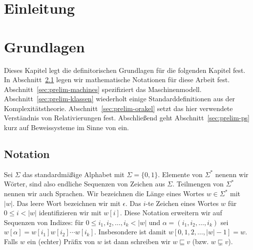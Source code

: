 \chapter{Einleitung}



\chapter{Grundlagen}

Dieses Kapitel legt die definitorischen Grundlagen für die folgenden Kapitel fest. In Abschnitt~\ref{sec:notation} legen wir mathematische Notationen für diese Arbeit fest. Abschnitt~\ref{sec:prelim-machines} spezifiziert das Maschinenmodell.  Abschnitt~\ref{sec:prelim-klassen} wiederholt einige Standarddefinitionen aus der Komplexitätstheorie. Abschnitt~\ref{sec:prelim-orakel} setzt das hier verwendete Verständnis von Relativierungen fest. Abschließend geht Abschnitt~\ref{sec:prelim-ps} kurz auf Beweissysteme im Sinne von \textcite{cook_relative_1979} ein.

\section{Notation}\label{sec:notation}

Sei $\Sigma$ das standardmäßige Alphabet mit $\Sigma=\{0,1\}$. Elemente von $\Sigma^*$ nenenn wir Wörter, sind also endliche Sequenzen von Zeichen aus $\Sigma$. Teilmengen von $\Sigma^*$ nennen wir auch Sprachen. Wir bezeichnen die Länge eines Wortes $w\in\Sigma^*$ mit $|w|$. Das leere Wort bezeichnen wir mit $\epsilon$. Das $i$-te Zeichen eines Wortes $w$ für $0\leq i< |w|$ identifizieren wir mit $w[i]$. Diese Notation erweitern wir auf Sequenzen von Indizes: für $0\leq i_1, i_2, \dots, i_k< |w|$ und $\alpha=(i_1, i_2, \dots, i_k)$ sei $w[\alpha] = w[i_1]w[i_2]\cdots w[i_k]$. Insbesondere ist damit $w[0,1,2,\dots, |w|-1]= w$.
Falls $w$ ein (echter) Präfix von $w$ ist dann schreiben wir $w \sqsubseteq v$ (bzw. $w\sqsubsetneq v$).

